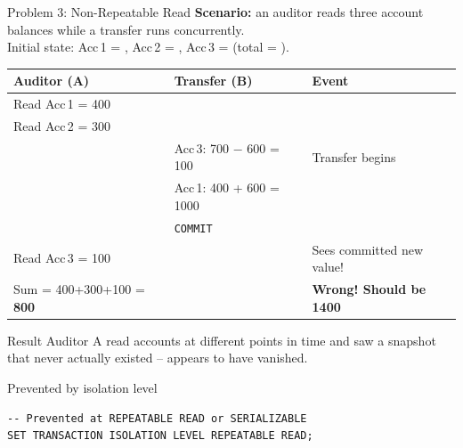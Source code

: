 \begin{frame}[fragile]{Problem 3: Non-Repeatable Read}
  \textbf{Scenario:} an auditor reads three account balances while a transfer runs concurrently.\\
  Initial state: Acc\,1 = , Acc\,2 = , Acc\,3 =  (total = ).

  \medskip
  \begin{tabular}{@{}p{3.5cm}p{4cm}p{3cm}@{}}
    \toprule
    \textbf{Auditor (A)} & \textbf{Transfer (B)} & \textbf{Event} \\
    \midrule
    Read Acc\,1 = 400 & & \\
    Read Acc\,2 = 300 & & \\
    & Acc\,3: 700 $-$ 600 = 100 & Transfer begins \\
    & Acc\,1: 400 + 600 = 1000 & \\
    & \texttt{COMMIT} & \\
    Read Acc\,3 = 100 & & Sees committed new value! \\
    Sum = 400+300+100 = \textbf{800} & & \textbf{Wrong! Should be 1400} \\
    \bottomrule
  \end{tabular}

  \begin{alertblock}{Result}
    Auditor A read accounts at different points in time and saw a snapshot that
    never actually existed --  appears to have vanished.
  \end{alertblock}

  \begin{block}{Prevented by isolation level}
\begin{lstlisting}[style=sqlstyle]
-- Prevented at REPEATABLE READ or SERIALIZABLE
SET TRANSACTION ISOLATION LEVEL REPEATABLE READ;
\end{lstlisting}
  \end{block}
\end{frame}

